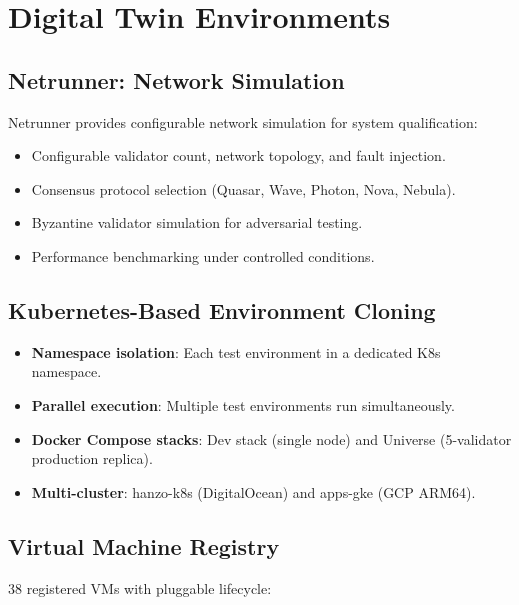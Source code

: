 \documentclass[11pt,letterpaper]{article}
\begin{document}
\section{Digital Twin Environments}

\subsection{Netrunner: Network Simulation}

Netrunner provides configurable network simulation for system qualification:

\begin{itemize}
\item Configurable validator count, network topology, and fault injection.
\item Consensus protocol selection (Quasar, Wave, Photon, Nova, Nebula).
\item Byzantine validator simulation for adversarial testing.
\item Performance benchmarking under controlled conditions.
\end{itemize}

\subsection{Kubernetes-Based Environment Cloning}

\begin{itemize}
\item \textbf{Namespace isolation}: Each test environment in a dedicated K8s namespace.
\item \textbf{Parallel execution}: Multiple test environments run simultaneously.
\item \textbf{Docker Compose stacks}: Dev stack (single node) and Universe (5-validator production replica).
\item \textbf{Multi-cluster}: hanzo-k8s (DigitalOcean) and apps-gke (GCP ARM64).
\end{itemize}

\subsection{Virtual Machine Registry}

38 registered VMs with pluggable lifecycle:
\end{document}
